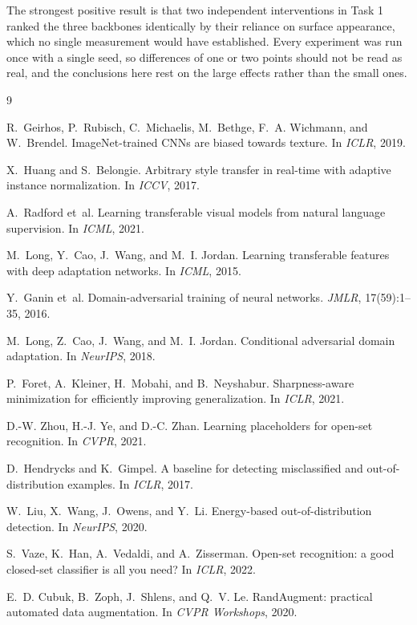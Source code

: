\documentclass{article}
\begin{document}
The strongest positive result is that two independent interventions in Task 1
ranked the three backbones identically by their reliance on surface
appearance, which no single measurement would have established. Every
experiment was run once with a single seed, so differences of one or two
points should not be read as real, and the conclusions here rest on the large
effects rather than the small ones.


\begin{thebibliography}{9}

R.~Geirhos, P.~Rubisch, C.~Michaelis, M.~Bethge, F.~A. Wichmann, and W.~Brendel.
\newblock ImageNet-trained CNNs are biased towards texture.
\newblock In \emph{ICLR}, 2019.

X.~Huang and S.~Belongie.
\newblock Arbitrary style transfer in real-time with adaptive instance normalization.
\newblock In \emph{ICCV}, 2017.

A.~Radford et~al.
\newblock Learning transferable visual models from natural language supervision.
\newblock In \emph{ICML}, 2021.

M.~Long, Y.~Cao, J.~Wang, and M.~I. Jordan.
\newblock Learning transferable features with deep adaptation networks.
\newblock In \emph{ICML}, 2015.

Y.~Ganin et~al.
\newblock Domain-adversarial training of neural networks.
\newblock \emph{JMLR}, 17(59):1--35, 2016.

M.~Long, Z.~Cao, J.~Wang, and M.~I. Jordan.
\newblock Conditional adversarial domain adaptation.
\newblock In \emph{NeurIPS}, 2018.

P.~Foret, A.~Kleiner, H.~Mobahi, and B.~Neyshabur.
\newblock Sharpness-aware minimization for efficiently improving generalization.
\newblock In \emph{ICLR}, 2021.

D.-W. Zhou, H.-J. Ye, and D.-C. Zhan.
\newblock Learning placeholders for open-set recognition.
\newblock In \emph{CVPR}, 2021.

D.~Hendrycks and K.~Gimpel.
\newblock A baseline for detecting misclassified and out-of-distribution examples.
\newblock In \emph{ICLR}, 2017.

W.~Liu, X.~Wang, J.~Owens, and Y.~Li.
\newblock Energy-based out-of-distribution detection.
\newblock In \emph{NeurIPS}, 2020.

S.~Vaze, K.~Han, A.~Vedaldi, and A.~Zisserman.
\newblock Open-set recognition: a good closed-set classifier is all you need?
\newblock In \emph{ICLR}, 2022.

E.~D. Cubuk, B.~Zoph, J.~Shlens, and Q.~V. Le.
\newblock RandAugment: practical automated data augmentation.
\newblock In \emph{CVPR Workshops}, 2020.

\end{thebibliography}
\end{document}
